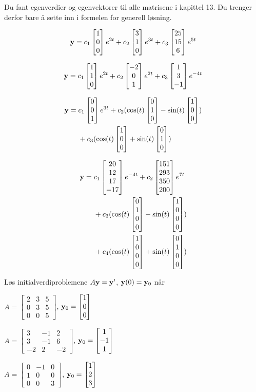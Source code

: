 \begin{losning}
Du fant egenverdier og egenvektorer til alle matrisene i kapittel 13. Du trenger derfor bare å sette inn i formelen for generell løsning.


\begin{punkt}
	$$\mathbf{y}=c_1\begin{bmatrix} 1 \\ 0 \\ 0 \end{bmatrix}e^{2t}+c_2\begin{bmatrix} 3 \\ 1 \\ 0 \end{bmatrix}e^{3t}+c_3\begin{bmatrix} 25 \\ 15 \\ 6 \end{bmatrix}e^{5t}$$
\end{punkt}

\begin{punkt}
	$$\mathbf{y}=c_1\begin{bmatrix} 1 \\ 1 \\ 0 \end{bmatrix}e^{2t}+c_2\begin{bmatrix} -2 \\ 0 \\ 1 \end{bmatrix}e^{2t}+c_3\begin{bmatrix} 1 \\ 3 \\ -1 \end{bmatrix}e^{-4t}$$
\end{punkt}

\begin{punkt}
$$	\begin{aligned}
	\mathbf{y}= {} & c_1\begin{bmatrix} 0 \\ 0 \\ 1 \end{bmatrix}e^{3t}+c_2(\cos (t) \begin{bmatrix} 0 \\ 1 \\ 0 \end{bmatrix}-\sin (t) \begin{bmatrix} 1 \\ 0 \\ 0 \end{bmatrix})\\
	& +c_3(\cos (t) \begin{bmatrix} 1 \\ 0 \\ 0 \end{bmatrix}+\sin (t) \begin{bmatrix} 0 \\ 1 \\ 0 \end{bmatrix})
	\end{aligned}$$
	
\end{punkt}

\begin{punkt} 
$$	\begin{aligned}
	\mathbf{y}= {} & c_1\begin{bmatrix} 20 \\ 12 \\ 17 \\ -17 \end{bmatrix}e^{-4t} +c_2\begin{bmatrix} 151 \\ 293 \\ 350 \\ 200 \end{bmatrix}e^{7t}\\
	& +c_3(\cos (t) \begin{bmatrix} 0 \\ 1 \\ 0 \\ 0 \end{bmatrix}-\sin (t) \begin{bmatrix} 1 \\ 0 \\ 0 \\ 0 \end{bmatrix})\\
	& +c_4(\cos (t) \begin{bmatrix} 1 \\ 0 \\ 0 \\ 0 \end{bmatrix}+\sin (t) \begin{bmatrix} 0 \\ 1 \\ 0 \\ 0 \end{bmatrix})
	\end{aligned}$$

\end{punkt}


	
\end{losning}

\begin{oppgave}
Løs initialverdiproblemene $A\mathbf{y}= \mathbf{y} '$, $\mathbf{y}(0)=\mathbf{y}_0$ når 

\begin{punkt}
	$
	A=
	\begin{bmatrix}
	2 & 3 & 5\\
	0 & 3 & 5\\
	0 & 0 & 5
	\end{bmatrix}
	$, $
	\mathbf{y}_0=\begin{bmatrix} 1 \\ 0 \\ 0 \end{bmatrix}
	$
\end{punkt}
%
\begin{punkt}
	$
	A=
	\begin{bmatrix}
	3 & -1 & 2\\
	3 & -1 & 6\\
	-2 & 2 & -2
	\end{bmatrix}$, $
	\mathbf{y}_0=\begin{bmatrix} 1 \\ -1 \\ 1 \end{bmatrix}
	$
\end{punkt}

\begin{punkt}
	$
	A=
	\begin{bmatrix}
	0 & -1 & 0\\
	1 & 0 & 0\\
	0 & 0 & 3
	\end{bmatrix}$, $
	\mathbf{y}_0=\begin{bmatrix} 1 \\ 2 \\ 3 \end{bmatrix}
	$
\end{punkt}


\end{oppgave}

